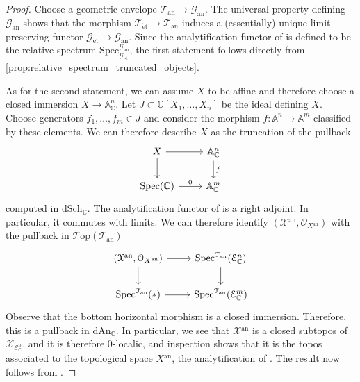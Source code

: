 \documentclass[12pt,a4paper,reqno]{amsart}
\theoremstyle{plain}
\theoremstyle{definition}
\theoremstyle{remark}
\numberwithin{equation}{section}
\begin{document}
\begin{proof}
	Choose a geometric envelope ${{\mathcal T}_{\mathrm{an}}} \to {\mathcal G}_{\mathrm{an}}$.
	The universal property defining ${\mathcal G}_{\mathrm{an}}$ shows that the morphism ${{\mathcal T}_{\mathrm{\acute{e}t}}} \to {{\mathcal T}_{\mathrm{an}}}$ induces a (essentially) unique limit-preserving functor ${\mathcal G}_{\mathrm{\acute{e}t}} \to {\mathcal G}_{\mathrm{an}}$.
	Since the analytification functor of \cite{DAG-IX} is defined to be the relative spectrum $\mathrm{Spec}^{{\mathcal G}_{\mathrm{an}}}_{{\mathcal G}_{\mathrm{\acute{e}t}}}$, the first statement follows directly from \cref{prop:relative_spectrum_truncated_objects}.
	
	As for the second statement, we can assume $X$ to be affine and therefore choose a closed immersion $X \to \mathbb A^n_{\mathbb C}$.
	Let $J \subset \mathbb C[X_1, \ldots, X_n]$ be the ideal defining $X$.
	Choose generators $f_1, \ldots, f_m \in J$ and consider the morphism $f \colon \mathbb A^n \to \mathbb A^m$ classified by these elements.
	We can therefore describe $X$ as the truncation of the pullback
	\[ \begin{tikzcd}
	X \arrow{d} \arrow{r} & \mathbb A^n_{\mathbb C} \arrow{d}{f} \\
	\operatorname{Spec}(\mathbb C) \arrow{r}{0} & \mathbb A^m_{\mathbb C}
	\end{tikzcd} \]
	computed in $\mathrm{dSch}_{\mathbb C}$.
	The analytification functor of \cite{DAG-IX} is a right adjoint. In particular, it commutes with limits.
	We can therefore identify $({\mathcal X}{^\mathrm{an}}, {\mathcal O}_{X{^\mathrm{an}}})$ with the pullback in ${\mathcal T\mathrm{op}}({{\mathcal T}_{\mathrm{an}}})$
	\[ \begin{tikzcd}
	({\mathcal X}{^\mathrm{an}}, {\mathcal O}_{X{^\mathrm{an}}}) \arrow{r} \arrow{d} & \operatorname{Spec}^{{\mathcal T}_{\mathrm{an}}}(\mathcal E^n_{\mathbb C}) \arrow{d} \\
	\operatorname{Spec}^{{\mathcal T}_{\mathrm{an}}}(*) \arrow{r} & \operatorname{Spec}^{{\mathcal T}_{\mathrm{an}}}(\mathcal E^m_{\mathbb C})
	\end{tikzcd} \]
	Observe that the bottom horizontal morphism is a closed immersion.
	Therefore, this is a pullback in $\mathrm{dAn}_{\mathbb C}$.
	In particular, we see that ${\mathcal X}{^\mathrm{an}}$ is a closed subtopos of ${\mathcal X}_{\mathcal E^n_{\mathbb C}}$, and it is therefore $0$-localic, and inspection shows that it is the topos associated to the topological space $X{^\mathrm{an}}$, the analytification of \cite{SGA1}.
	The result now follows from \cite[Lemma 12.19]{DAG-IX}.
\end{proof}
\end{document}
